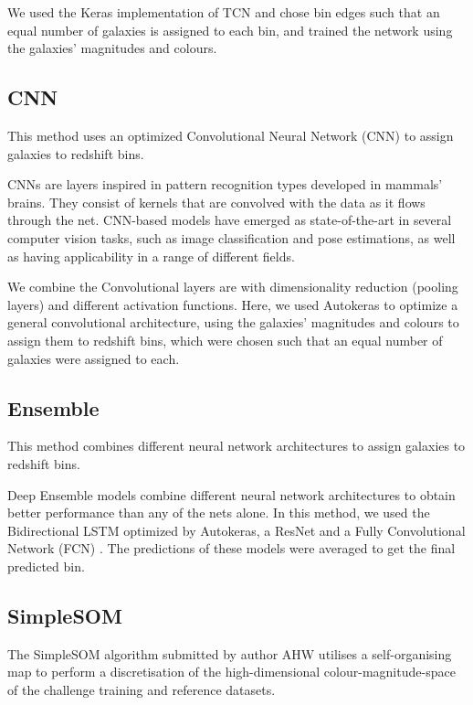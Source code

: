 \documentclass[twocolumn,twocolappendix]{aastex63}
\begin{document}
We used the Keras implementation of TCN \citep{kerastcn} and chose bin edges such that an equal
number of galaxies is assigned to each bin, and trained the network using the galaxies' magnitudes
and colours. 

\subsection{ {\sc CNN} } \label{sec:cnn}
This method uses an optimized Convolutional Neural Network (CNN) to assign
galaxies to redshift bins. 
 
CNNs \citep{lecun2015deep} are layers inspired in pattern recognition types developed in mammals' brains.
They consist of kernels that are convolved with the data as it flows through the net. CNN-based
models have emerged as state-of-the-art in several computer vision tasks, such as image
classification and pose estimations, as well as having applicability in a range of different fields.
 
We combine the Convolutional layers are with dimensionality reduction (pooling layers) and different
activation functions. Here, we used Autokeras to optimize a general convolutional architecture,
using the galaxies' magnitudes and colours to assign them to redshift bins, which were chosen such
that an equal number of galaxies were assigned to each.


\subsection{ {\sc Ensemble} } 
\label{ClecioEnsemble} 
This method combines different neural network
architectures to assign galaxies to redshift bins.
 
Deep Ensemble models combine different neural network architectures to obtain better performance
than any of the nets alone. In this method, we used the Bidirectional LSTM optimized by Autokeras, a
ResNet \citep{resnet} and a Fully Convolutional Network (FCN) \citep{fcn}. The predictions of these
models were averaged to get the final predicted bin. 
 


\subsection{ {\sc SimpleSOM} }
The SimpleSOM algorithm submitted by author AHW utilises a self-organising map
\citep[SOM,][]{Kohonen:1982} to perform  a discretisation of the
high-dimensional colour-magnitude-space of the challenge training and reference
datasets. 
\end{document}
